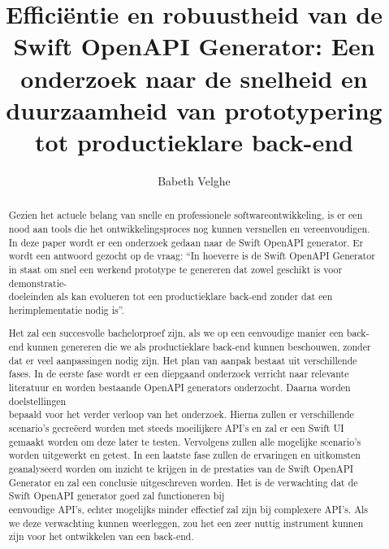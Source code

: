 \documentclass{hogent-article}
\title{Efficiëntie en robuustheid van de Swift OpenAPI Generator: Een onderzoek naar de snelheid en duurzaamheid van prototypering tot productieklare back-end}
\author{Babeth Velghe}
\begin{document}
\begin{abstract}
  Gezien het actuele belang van snelle en professionele softwareontwikkeling, is er een nood aan tools die het ontwikkelingsproces nog kunnen versnellen en vereenvoudigen. In deze paper wordt er een onderzoek gedaan naar de Swift OpenAPI generator. Er wordt een antwoord gezocht op de vraag: “In hoeverre is de Swift OpenAPI Generator in staat om snel een werkend prototype te genereren dat zowel geschikt is voor demonstratie-\\doeleinden als kan evolueren tot een productieklare back-end zonder dat een herimplementatie nodig is”. 
  
  Het zal een succesvolle bachelorproef zijn, als we op een eenvoudige manier een back-end kunnen genereren die we als productieklare back-end kunnen beschouwen, zonder dat er veel aanpassingen nodig zijn.
  Het plan van aanpak bestaat uit verschillende fases. In de eerste fase wordt er een diepgaand onderzoek verricht naar relevante literatuur en worden bestaande OpenAPI generators onderzocht. Daarna worden doelstellingen \\bepaald voor het verder verloop van het onderzoek. Hierna zullen er verschillende scenario’s gecreëerd worden met steeds moeilijkere API’s en zal er een Swift UI gemaakt worden om deze later te testen. Vervolgens zullen alle mogelijke scenario’s worden uitgewerkt en getest. In een laatste fase zullen de ervaringen en uitkomsten geanalyseerd worden om inzicht te krijgen in de prestaties van de Swift OpenAPI Generator en zal een conclusie uitgeschreven worden.
  Het is de verwachting dat de Swift OpenAPI generator goed zal functioneren bij \\eenvoudige API's, echter mogelijks minder effectief zal zijn bij complexere API's. Als we deze verwachting kunnen weerleggen, zou het een zeer nuttig instrument kunnen zijn voor het ontwikkelen van een back-end.
  
  
\end{abstract}

\tableofcontents



\printbibliography[heading=bibintoc]
\end{document}
